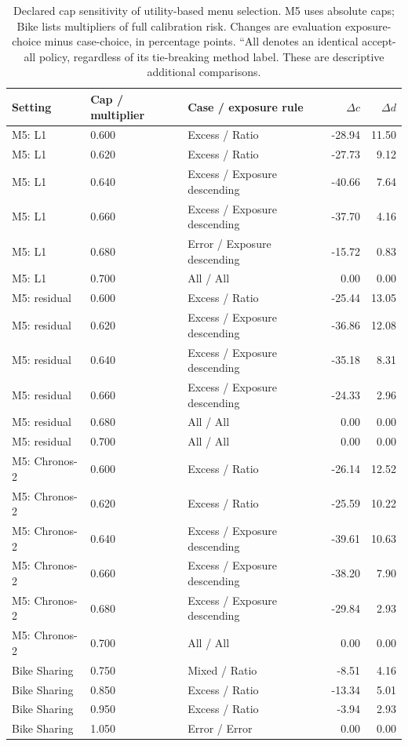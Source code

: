 \begin{table}[t]
\centering\scriptsize
\caption{Declared cap sensitivity of utility-based menu selection. M5 uses absolute caps; Bike lists multipliers of full calibration risk. Changes are evaluation exposure-choice minus case-choice, in percentage points. ``All denotes an identical accept-all policy, regardless of its tie-breaking method label. These are descriptive additional comparisons.}
\label{tab:choice-caps}
\begin{tabular}{lllr r}
\toprule
Setting & Cap / multiplier & Case / exposure rule & $\Delta c$ & $\Delta d$ \\
\midrule
M5: L1 & 0.600 & Excess / Ratio & -28.94 & 11.50 \\
M5: L1 & 0.620 & Excess / Ratio & -27.73 & 9.12 \\
M5: L1 & 0.640 & Excess / Exposure descending & -40.66 & 7.64 \\
M5: L1 & 0.660 & Excess / Exposure descending & -37.70 & 4.16 \\
M5: L1 & 0.680 & Error / Exposure descending & -15.72 & 0.83 \\
M5: L1 & 0.700 & All / All & 0.00 & 0.00 \\
M5: residual & 0.600 & Excess / Ratio & -25.44 & 13.05 \\
M5: residual & 0.620 & Excess / Exposure descending & -36.86 & 12.08 \\
M5: residual & 0.640 & Excess / Exposure descending & -35.18 & 8.31 \\
M5: residual & 0.660 & Excess / Exposure descending & -24.33 & 2.96 \\
M5: residual & 0.680 & All / All & 0.00 & 0.00 \\
M5: residual & 0.700 & All / All & 0.00 & 0.00 \\
M5: Chronos-2 & 0.600 & Excess / Ratio & -26.14 & 12.52 \\
M5: Chronos-2 & 0.620 & Excess / Ratio & -25.59 & 10.22 \\
M5: Chronos-2 & 0.640 & Excess / Exposure descending & -39.61 & 10.63 \\
M5: Chronos-2 & 0.660 & Excess / Exposure descending & -38.20 & 7.90 \\
M5: Chronos-2 & 0.680 & Excess / Exposure descending & -29.84 & 2.93 \\
M5: Chronos-2 & 0.700 & All / All & 0.00 & 0.00 \\
Bike Sharing & 0.750 & Mixed / Ratio & -8.51 & 4.16 \\
Bike Sharing & 0.850 & Excess / Ratio & -13.34 & 5.01 \\
Bike Sharing & 0.950 & Excess / Ratio & -3.94 & 2.93 \\
Bike Sharing & 1.050 & Error / Error & 0.00 & 0.00 \\
\bottomrule
\end{tabular}
\end{table}
